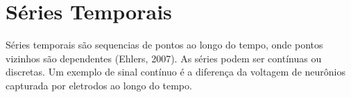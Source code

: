 \chapter{Séries Temporais}

Séries temporais são sequencias de pontos ao longo do tempo, onde pontos vizinhos são dependentes (Ehlers, 2007). 
As séries podem ser contínuas ou discretas. Um exemplo de sinal contínuo é a diferença da voltagem de neurônios
capturada por eletrodos ao longo do tempo. 